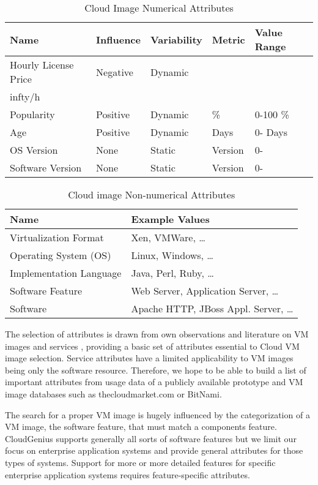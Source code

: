 \documentclass[10pt]{article}
\begin{document}
\begin{table}[h]
\centering
\caption{Cloud Image Numerical Attributes}\label{image-numerical-attributes}
\begin{tabular}{|l|l|l|l|l|} \hline
Name&Influence&Variability&Metric&Value Range\\ \hline
Hourly License Price&Negative&Dynamic&\\infty/h\\
Popularity&Positive&Dynamic&\%&0-100 \%\\
Age&Positive&Dynamic&Days&0- Days\\
OS Version&None&Static&Version&0-\\
Software Version&None&Static&Version&0-\\
\hline\end{tabular}
\end{table}

\begin{table}[h]
\centering
\caption{Cloud image Non-numerical Attributes}\label{image-nonnumerical-attributes}
\begin{tabular}{|l|l|} \hline
Name&Example Values\\ \hline
Virtualization Format&Xen, VMWare, \ldots\\
Operating System (OS)&Linux, Windows, \ldots\\
Implementation Language&Java, Perl, Ruby, \ldots\\
Software Feature&Web Server, Application Server, \ldots\\
Software&Apache HTTP, JBoss Appl. Server, \ldots\\
\hline\end{tabular}
\end{table}

The selection of attributes is drawn from own observations and literature on VM images and services \cite{dastjerdi2010effective}\cite{kalepu2003verity}, providing a basic set of attributes essential to Cloud VM image selection. Service attributes have a limited applicability to VM images being only the software resource. Therefore, we hope to be able to build a list of important attributes from usage data of a publicly available prototype\cite{cumulusgenius2011,cumulusgeniusonline2011} and VM image databases such as thecloudmarket.com\cite{cloudmarket2011} or BitNami\cite{bitnami2011}.

The search for a proper VM image is hugely influenced by the categorization of a VM image, the software feature, that must match a components feature. CloudGenius supports generally all sorts of software features but we limit our focus on enterprise application systems and provide general attributes for those types of systems. Support for more or more detailed features for specific enterprise application systems requires feature-specific attributes.
\end{document}

